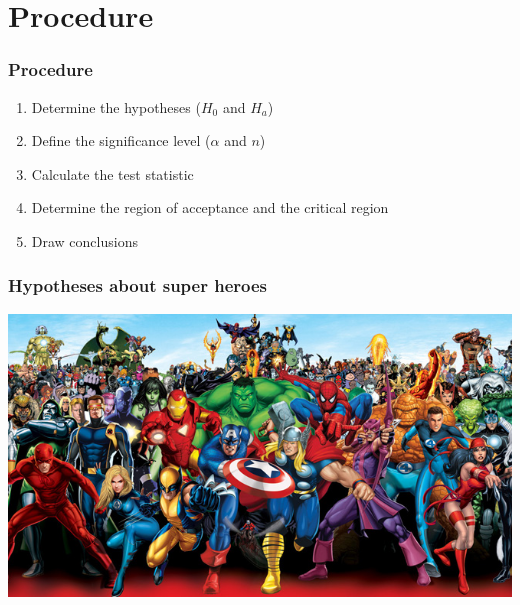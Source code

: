 \documentclass{beamer}
\begin{document}
\section{Procedure}
\sectionframelogo{}

\begin{frame}
  \frametitle{Procedure}

  \begin{enumerate}
    \item Determine the hypotheses ($H_0$ and $H_a$)
    \item Define the significance level ($\alpha$ and $n$)
    \item Calculate the test statistic
    \item Determine the region of acceptance and the critical region
    \item Draw conclusions
  \end{enumerate}
\end{frame}

\begin{frame}
  \frametitle{Hypotheses about super heroes}

  \includegraphics[width=\textwidth]{img/les5-heroes}
\end{frame}
\end{document}
